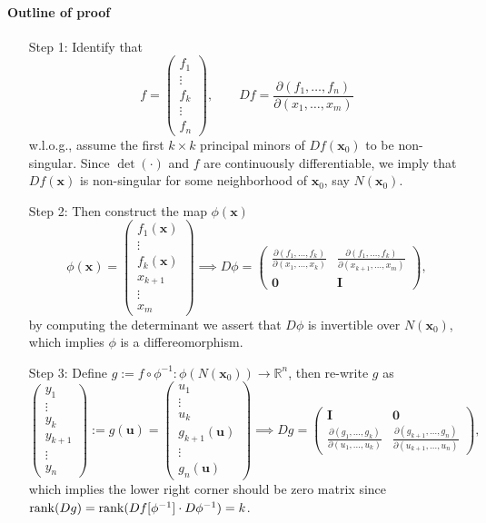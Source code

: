 \paragraph{Outline of proof}
\begin{enumerate}
\item[Step 1:] Identify that
\[
f=\begin{pmatrix}
f_1\\\vdots\\f_k\\\vdots\\f_n
\end{pmatrix},\qquad
Df=\frac{\partial(f_1,\dots,f_n)}{\partial(x_1,\dots,x_m)}
\]
w.l.o.g., assume the first $k\times k$ principal minors of $Df(\bm x_0)$ to be non-singular. Since $\det(\cdot)$ and $f$ are continuously differentiable, we imply that $Df(\bm x)$ is non-singular for some neighborhood of $\bm x_0$, say $N(\bm x_0)$.
\item[Step 2:] Then construct the map $\phi(\bm x)$
\[
\phi(\bm x)=\begin{pmatrix}
f_1(\bm x)\\\vdots\\f_k(\bm x)\\x_{k+1}\\\vdots\\x_m
\end{pmatrix}\implies
D\phi=\begin{pmatrix}
\frac{\partial(f_1,\dots,f_k)}{\partial(x_1,\dots,x_k)}&
\frac{\partial(f_1,\dots,f_k)}{\partial(x_{k+1},\dots,x_m)}
\\
\bm0&\bm I
\end{pmatrix},
\]
by computing the determinant we assert that $D\phi$ is invertible over $N(\bm x_0)$, which implies $\phi$ is a differeomorphism.
\item[Step 3:] Define $g:=f\circ \phi^{-1}: \phi(N(\bm x_0))\to\mathbb{R}^n$, then re-write $g$ as
\[
\begin{pmatrix}
y_1\\\vdots\\y_k\\y_{k+1}\\\vdots\\y_n
\end{pmatrix}
:=g(\bm u)=
\begin{pmatrix}
u_1\\\vdots\\u_k\\g_{k+1}(\bm u)\\\vdots\\g_n(\bm u)
\end{pmatrix}
\implies
Dg=\begin{pmatrix}
\bm I&\bm0\\
\frac{\partial(g_1,\dots,g_k)}{\partial(u_1,\dots,u_k)}&\frac{\partial (g_{k+1},\dots,g_n)}{\partial(u_{k+1},\dots,u_n)}
\end{pmatrix},
\]
which implies the lower right corner should be zero matrix since $\operatorname{rank}(Dg)=\operatorname{rank}(Df[\phi^{-1}]\cdot D\phi^{-1})=k$. 


\end{enumerate}
